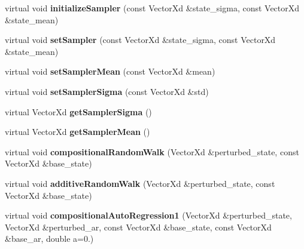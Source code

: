 \begin{DoxyCompactItemize}
\item 
\hypertarget{classStateSpaceModel_ad205d63f37f8dce3ec521ba72a7c0ba8}{virtual void {\bfseries initialize\-Sampler} (const Vector\-Xd \&state\-\_\-sigma, const Vector\-Xd \&state\-\_\-mean)}\label{classStateSpaceModel_ad205d63f37f8dce3ec521ba72a7c0ba8}

\item 
\hypertarget{classStateSpaceModel_a7016de63d72ffce510fdec3ac63b96c3}{virtual void {\bfseries set\-Sampler} (const Vector\-Xd \&state\-\_\-sigma, const Vector\-Xd \&state\-\_\-mean)}\label{classStateSpaceModel_a7016de63d72ffce510fdec3ac63b96c3}

\item 
\hypertarget{classStateSpaceModel_addf7f5a6d6d2d1ecd31d7787ec80feb7}{virtual void {\bfseries set\-Sampler\-Mean} (const Vector\-Xd \&mean)}\label{classStateSpaceModel_addf7f5a6d6d2d1ecd31d7787ec80feb7}

\item 
\hypertarget{classStateSpaceModel_aea9777c1dadc0ea82f62d3e1eb560198}{virtual void {\bfseries set\-Sampler\-Sigma} (const Vector\-Xd \&std)}\label{classStateSpaceModel_aea9777c1dadc0ea82f62d3e1eb560198}

\item 
\hypertarget{classStateSpaceModel_a006f7c380b7e979555a0924633f99cb3}{virtual Vector\-Xd {\bfseries get\-Sampler\-Sigma} ()}\label{classStateSpaceModel_a006f7c380b7e979555a0924633f99cb3}

\item 
\hypertarget{classStateSpaceModel_a898fc3723557c462f075ed007a9d87c5}{virtual Vector\-Xd {\bfseries get\-Sampler\-Mean} ()}\label{classStateSpaceModel_a898fc3723557c462f075ed007a9d87c5}

\item 
\hypertarget{classStateSpaceModel_ab8d021f04732f3cf851121567a3ed49d}{virtual void {\bfseries compositional\-Random\-Walk} (Vector\-Xd \&perturbed\-\_\-state, const Vector\-Xd \&base\-\_\-state)}\label{classStateSpaceModel_ab8d021f04732f3cf851121567a3ed49d}

\item 
\hypertarget{classStateSpaceModel_a9d1f89aa055137020a1de8b5c64af740}{virtual void {\bfseries additive\-Random\-Walk} (Vector\-Xd \&perturbed\-\_\-state, const Vector\-Xd \&base\-\_\-state)}\label{classStateSpaceModel_a9d1f89aa055137020a1de8b5c64af740}

\item 
\hypertarget{classStateSpaceModel_ad6d792b9b4ae739a2b301bd7152fd642}{virtual void {\bfseries compositional\-Auto\-Regression1} (Vector\-Xd \&perturbed\-\_\-state, Vector\-Xd \&perturbed\-\_\-ar, const Vector\-Xd \&base\-\_\-state, const Vector\-Xd \&base\-\_\-ar, double a=0.)}\label{classStateSpaceModel_ad6d792b9b4ae739a2b301bd7152fd642}


\end{DoxyCompactItemize}
